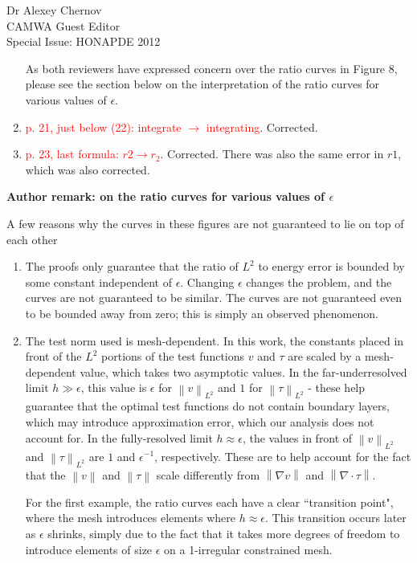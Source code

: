 \documentclass{letter}
\newcommand{\nor}[1]{\left\| #1 \right\|}
\newcommand{\grad}{\nabla}
\renewcommand{\div}{\grad \cdot}
\begin{document}
\begin{letter}{Dr Alexey Chernov\\CAMWA Guest Editor\\Special Issue: HONAPDE 2012}
\begin{enumerate}
As both reviewers have expressed concern over the ratio curves in Figure 8, please see the section below on the interpretation of the ratio curves for various values of $\epsilon$.  

\item \textcolor{red}{p. 21, just below (22): integrate $\rightarrow$ integrating}.  Corrected.
\item \textcolor{red}{p. 23, last formula: $r2 \rightarrow r_2$}.  Corrected.  There was also the same error in $r1$, which was also corrected.
\end{enumerate}

\textbf{Author remark: on the ratio curves for various values of $\epsilon$}

A few reasons why the curves in these figures are not guaranteed to lie on top of each other 
\begin{enumerate}
\item The proofs only guarantee that the ratio of $L^2$ to energy error is bounded by some constant independent of $\epsilon$.  Changing $\epsilon$ changes the problem, and the curves are not guaranteed to be similar.  The curves are not guaranteed even to be bounded away from zero; this is simply an observed phenomenon.  
\item The test norm used is mesh-dependent.  In this work, the constants placed in front of the $L^2$ portions of the test functions $v$ and $\tau$ are scaled by a mesh-dependent value, which takes two asymptotic values.  In the far-underresolved limit $h \gg \epsilon$, this value is $\epsilon$ for $\nor{v}_{L^2}$ and $1$ for $\nor{\tau}_{L^2}$ - these help guarantee that the optimal test functions do not contain boundary layers, which may introduce approximation error, which our analysis does not account for.  In the fully-resolved limit $h\approx \epsilon$, the values in front of $\nor{v}_{L^2}$ and $\nor{\tau}_{L^2}$ are $1$ and $\epsilon^{-1}$, respectively.  These are to help account for the fact that the $\nor{v}$ and $\nor{\tau}$ scale differently from $\nor{\grad v}$ and $\nor{\div \tau}$.  

For the first example, the ratio curves each have a clear ``transition point", where the mesh introduces elements where $h \approx \epsilon$.  This transition occurs later as $\epsilon$ shrinks, simply due to the fact that it takes more degrees of freedom to introduce elements of size $\epsilon$ on a 1-irregular constrained mesh.  


\end{enumerate}
\end{letter}
\end{document}

